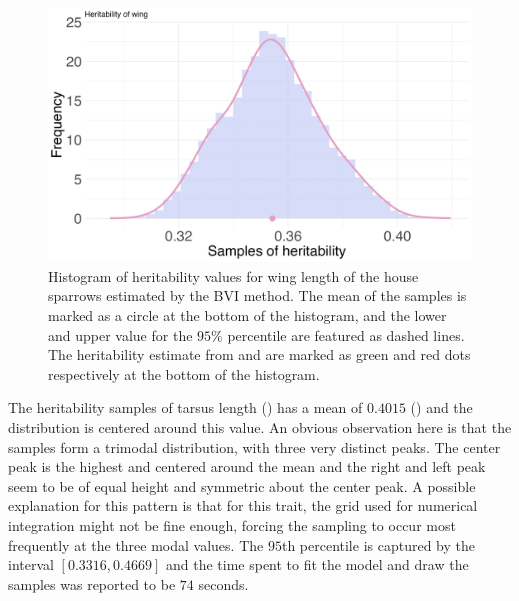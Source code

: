 \begin{figure}[H]%
  \centering
  \includegraphics[width=1\linewidth]{Figures/House sparrow study/Heritability_wing.png}
  \caption{Histogram of heritability values for wing length of the house sparrows estimated by the BVI method. The mean of the samples is marked as a circle at the bottom of the histogram, and the lower and upper value for the $95\%$ percentile are featured as dashed lines. The heritability estimate from \citet{Silva2017} and \citet{Muff2019Genetic} are marked as green and red dots respectively at the bottom of the histogram.}
  \label{fig:heritability_wing}
\end{figure}
\noindent The heritability samples of tarsus length () has a mean of $0.4015$ () and the distribution is centered around this value. An obvious observation here is that the samples form a trimodal distribution, with three very distinct peaks. The center peak is the highest and centered around the mean and the right and left peak seem to be of equal height and symmetric about the center peak. A possible explanation for this pattern is that for this trait, the grid used for numerical integration might not be fine enough, forcing the sampling to occur most frequently at the three modal values. The $95$th percentile is captured by the interval $[0.3316, 0.4669]$ and the time spent to fit the model and draw the samples was reported to be $74$ seconds.  
